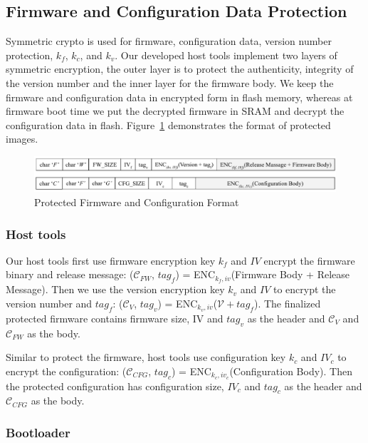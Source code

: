 \documentclass[11pt,oneside,onecolumn,letterpaper]{article}
\begin{document}
\subsection{Firmware and Configuration Data Protection}
Symmetric crypto is used for firmware, configuration data, version number protection, $k_f$, $k_c$, and $k_v$.
Our developed host tools implement two layers of symmetric encryption, the outer layer is to protect the authenticity, integrity of the version number and the inner layer for the firmware body.
We keep the firmware and configuration data in encrypted form in flash memory, whereas at firmware boot time we put the decrypted firmware in SRAM and decrypt the configuration data in flash.
Figure~\ref{fig:frmt} demonstrates the format of protected images.

\begin{figure}[!htbp]
	\begin{centering}
		\includegraphics[width = .98\textwidth]{pic/FW_CFG_FORMAT.pdf}
		\caption{Protected Firmware and Configuration Format}
		\label{fig:frmt}
	\end{centering}
\end{figure}

\subsubsection{Host tools}
Our host tools first use firmware encryption key $k_f$ and $IV$ encrypt the firmware binary and release message: ($\mathcal{C}_{FW}$, $tag_f$) = ENC$_{k_f, iv}$(Firmware Body + Release Message).
Then we use the version encryption key $k_v$ and $IV$ to encrypt the version number and $tag_f$: ($\mathcal{C}_V$, $tag_v$) = ENC$_{k_v, iv}$($\mathcal{V} + tag_f$).
The finalized protected firmware contains firmware size, IV and $tag_v$ as the header and $\mathcal{C}_V$ and $\mathcal{C}_{FW}$ as the body.

Similar to protect the firmware, host tools use configuration key $k_c$ and $IV_c$ to encrypt the configuration: ($\mathcal{C}_{CFG}$, $tag_c$) = ENC$_{k_c, iv_c}$(Configuration Body).
Then the protected configuration has configuration size, $IV_c$ and $tag_c$ as the header and $\mathcal{C}_{CFG}$ as the body.

\subsubsection{Bootloader}
\end{document}
